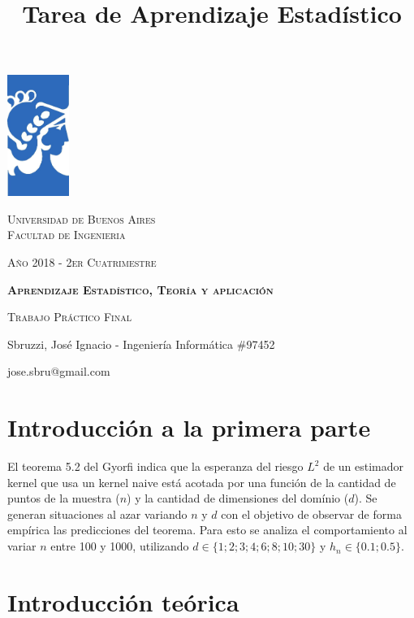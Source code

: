 \documentclass[12pt, a4paper]{article}
\title{Tarea de Aprendizaje Estadístico}
\author{}
\date{}
\begin{document}
\begin{titlepage} %
	\centering
	  \includegraphics[width=0.15\textwidth]{FIUBA_logo}\par
	  {\scshape\Large Universidad de Buenos Aires
      \\ Facultad de Ingenieria \par}
      {\scshape\small Año 2018 - 2er Cuatrimestre \par}
	  \vspace{1cm}
	  {\scshape\bfseries\LARGE Aprendizaje Estadístico, Teoría y aplicación\par}
	  \vspace{0.5cm}
	  \vspace{1cm}
      {\scshape\large Trabajo Práctico Final \par}
      \vspace{0.5cm
      \raggedright}
      \vspace{0.5cm}
    \centering
	  {\normalsize Sbruzzi, José Ignacio - Ingeniería Informática \#97452 \par}
      {\small  jose.sbru@gmail.com \par}
\end{titlepage} %
\newpage
\tableofcontents
\section{Introducción a la primera parte}
El teorema 5.2 del Gyorfi indica que la esperanza del riesgo $L^2$ de un estimador kernel que usa un kernel naive está acotada por una función de la cantidad de puntos de la muestra ($n$) y la cantidad de dimensiones del domínio ($d$). Se generan situaciones al azar variando $n$ y $d$ con el objetivo de observar de forma empírica las predicciones del teorema.
Para esto se analiza el comportamiento al variar $n$ entre 100 y 1000, utilizando $d\in\{1;2;3;4;6;8;10;30\}$ y $h_n\in\{ 0.1; 0.5 \}$.
\section{Introducción teórica}
\end{document}
